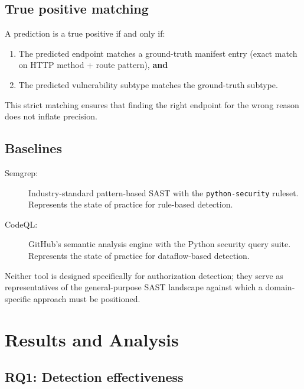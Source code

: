\subsection{True positive matching}

A prediction is a true positive if and only if:
\begin{enumerate}
    \item The predicted endpoint matches a ground-truth manifest entry (exact
    match on HTTP method + route pattern), \textbf{and}
    \item The predicted vulnerability subtype matches the ground-truth
    subtype.
\end{enumerate}
This strict matching ensures that finding the right endpoint for the wrong
reason does not inflate precision.

\subsection{Baselines}

\begin{description}
    \item[Semgrep:] Industry-standard pattern-based SAST with the
    \texttt{python-security} ruleset. Represents the state of practice for
    rule-based detection.
    \item[CodeQL:] GitHub's semantic analysis engine with the Python security
    query suite. Represents the state of practice for dataflow-based
    detection.
\end{description}

Neither tool is designed specifically for authorization detection; they serve
as representatives of the general-purpose SAST landscape against which a
domain-specific approach must be positioned.


\section{Results and Analysis}
\label{det:results}

\subsection{RQ1: Detection effectiveness}
\label{sec:det-rq1}

